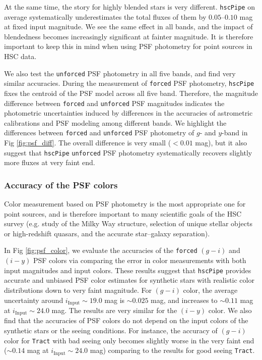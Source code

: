 \documentclass[useamsfonts]{pasj01}
\def\hscpipe{\texttt{hscPipe}}
\def\forced{\texttt{forced}}
\def\unforced{\texttt{unforced}}
\def\tract{\texttt{Tract}}
\begin{document}
    At the same time, the story for highly blended stars is very different.
    \hscpipe{} on average systematically underestimates the total fluxes of them by
    $0.05$--$0.10$ mag at fixed input magnitude.
    We see the same effect in all bands, and the impact of blendedness becomes
    increasingly significant at fainter magnitude.
    It is therefore important to keep this in mind when using PSF photometry for point
    sources in HSC data.

    We also test the \unforced{} PSF photometry in all five bands, and find very similar
    accuracies.
    During the measurement of \forced{} PSF photometry, \hscpipe{} fixes the centroid
    of the PSF model across all five band.
    Therefore, the magnitude difference between \forced{} and \unforced{} PSF magnitudes
    indicates the photometric uncertainties induced by differences in the accuracies of
    astrometric calibrations and PSF modeling among different bands.
    We highlight the differences between \forced{} and \unforced{} PSF photometry of
    $g$- and $y$-band in Fig \ref{fig:psf_diff}.
    The overall difference is very small ($<0.01$ mag), but it also suggest that
    \hscpipe{} \unforced{} PSF photometry systematically recovers slightly more fluxes
    at very faint end.

\subsubsection{Accuracy of the PSF colors}

    Color measurement based on PSF photometry is the most appropriate one for point
    sources, and is therefore important to many scientific goals of the HSC survey
    (e.g. study of the Milky Way structure, selection of unique stellar objects or
    high-redshift quasars, and the accurate star--galaxy separation).

    In Fig \ref{fig:psf_color}, we evaluate the accuracies of the \forced{} $(g-i)$
    and $(i-y)$ PSF colors via comparing the error in color measurements with both
    input magnitudes and input colors.
    These results suggest that \hscpipe{} provides accurate and unbiased PSF color
    estimates for synthetic stars with realistic color distributions down to very faint
    magnitude.
    For $(g-i)$ color, the average uncertainty around $i_{\mathrm{Input}}{\sim}19.0$ mag
    is ${\sim}0.025$ mag, and increases to ${\sim}0.11$ mag at
    $i_{\mathrm{Input}}{\sim}24.0$ mag.
    The results are very similar for the $(i-y)$ color.
    We also find that the accuracies of PSF colors do not depend on the input colors of
    the synthetic stars or the seeing conditions.
    For instance, the accuracy of $(g-i)$ color for \tract{} with bad seeing only becomes
    slightly worse in the very faint end (${\sim}0.14$ mag at
    $i_{\mathrm{Input}}{\sim}24.0$ mag) comparing to the results for good seeing \tract{}.
\end{document}
